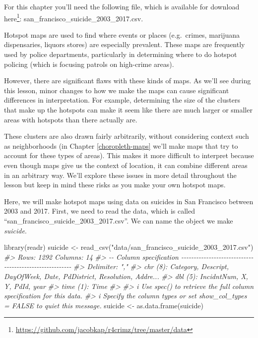 \documentclass[
]{krantz}
\makeatletter
\newenvironment{Shaded}{\begin{snugshade}}{\end{snugshade}}
\newcommand{\CommentTok}[1]{\textcolor[rgb]{0.37,0.37,0.37}{\textit{#1}}}
\newcommand{\FunctionTok}[1]{\textcolor[rgb]{0,0,0}{#1}}
\newcommand{\NormalTok}[1]{#1}
\newcommand{\OtherTok}[1]{\textcolor[rgb]{0.37,0.37,0.37}{#1}}
\newcommand{\StringTok}[1]{\textcolor[rgb]{0.5,0.5,0.5}{#1}}
\renewcommand{\href}[2]{#2\footnote{\url{#1}}}
\newenvironment{kframe}{%
\medskip{}
\setlength{\fboxsep}{.8em}
 \def\at@end@of@kframe{}%
 \ifinner\ifhmode%
  \def\at@end@of@kframe{\end{minipage}}%
  \begin{minipage}{\columnwidth}%
 \fi\fi%
 \def\FrameCommand##1{\hskip\@totalleftmargin \hskip-\fboxsep
 \colorbox{shadecolor}{##1}\hskip-\fboxsep
     \hskip-\linewidth \hskip-\@totalleftmargin \hskip\columnwidth}%
 \MakeFramed {\advance\hsize-\width
   \@totalleftmargin\z@ \linewidth\hsize
   \@setminipage}}%
 {\par\unskip\endMakeFramed%
 \at@end@of@kframe}
\renewenvironment{Shaded}{\begin{kframe}}{\end{kframe}}
\makeatother
\begin{document}
For this chapter you'll need the following file, which is available for download \href{https://github.com/jacobkap/r4crimz/tree/master/data}{here}: san\_francisco\_suicide\_2003\_2017.csv.

Hotspot maps are used to find where events or places (e.g.~crimes, marijuana dispensaries, liquors stores) are especially prevalent. These maps are frequently used by police departments, particularly in determining where to do hotspot policing (which is focusing patrols on high-crime areas).

However, there are significant flaws with these kinds of maps. As we'll see during this lesson, minor changes to how we make the maps can cause significant differences in interpretation. For example, determining the size of the clusters that make up the hotspots can make it seem like there are much larger or smaller areas with hotspots than there actually are.

These clusters are also drawn fairly arbitrarily, without considering context such as neighborhoods (in Chapter \ref{choropleth-maps} we'll make maps that try to account for these types of areas). This makes it more difficult to interpret because even though maps give us the context of location, it can combine different areas in an arbitrary way. We'll explore these issues in more detail throughout the lesson but keep in mind these risks as you make your own hotspot maps.

Here, we will make hotspot maps using data on suicides in San Francisco between 2003 and 2017. First, we need to read the data, which is called ``san\_francisco\_suicide\_2003\_2017.csv''. We can name the object we make \emph{suicide}.

\begin{Shaded}
\begin{Highlighting}[]
\FunctionTok{library}\NormalTok{(readr)}
\NormalTok{suicide }\OtherTok{\textless{}{-}} \FunctionTok{read\_csv}\NormalTok{(}\StringTok{"data/san\_francisco\_suicide\_2003\_2017.csv"}\NormalTok{)}
\CommentTok{\#\textgreater{} Rows: 1292 Columns: 14}
\CommentTok{\#\textgreater{} {-}{-} Column specification {-}{-}{-}{-}{-}{-}{-}{-}{-}{-}{-}{-}{-}{-}{-}{-}{-}{-}{-}{-}{-}{-}{-}{-}{-}{-}{-}{-}{-}{-}{-}{-}{-}{-}{-}{-}{-}{-}{-}{-}{-}{-}{-}{-}{-}{-}{-}{-}{-}{-}{-}{-}{-}{-}{-}{-}}
\CommentTok{\#\textgreater{} Delimiter: ","}
\CommentTok{\#\textgreater{} chr  (8): Category, Descript, DayOfWeek, Date, PdDistrict, Resolution, Addre...}
\CommentTok{\#\textgreater{} dbl  (5): IncidntNum, X, Y, PdId, year}
\CommentTok{\#\textgreater{} time (1): Time}
\CommentTok{\#\textgreater{} }
\CommentTok{\#\textgreater{} i Use \textasciigrave{}spec()\textasciigrave{} to retrieve the full column specification for this data.}
\CommentTok{\#\textgreater{} i Specify the column types or set \textasciigrave{}show\_col\_types = FALSE\textasciigrave{} to quiet this message.}
\NormalTok{suicide }\OtherTok{\textless{}{-}} \FunctionTok{as.data.frame}\NormalTok{(suicide)}
\end{Highlighting}
\end{Shaded}
\end{document}
